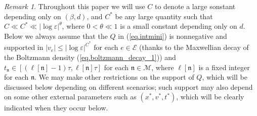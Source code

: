\documentclass[10pt, reqno]{amsart}
\newcommand{\Ec}{\mathcal E}
\renewcommand{\Mc}{\mathcal M}
\newcommand{\nf}{\mathfrak n}
\theoremstyle{definition}
\theoremstyle{remark}
\newtheorem{remark}[theorem]{Remark}
\numberwithin{equation}{section}
\begin{document}
\begin{remark}\label{rem.parameter} Throughout this paper we will use $C$ to denote a large sonstant depending only on $(\beta,d)$, and $C^*$ be any large quantity such that $C\ll C^*\ll|\log\varepsilon|^{\theta}$, where $0<\theta\ll 1$ is a small constant depending only on $d$. Below we always assume that the $Q$ in (\ref{eq.intmini}) is nonnegative and supported in $|v_e|\leq|\log\varepsilon|^{C^*}$ for each $e\in\Ec$ (thanks to the Maxwellian decay of the Boltzmann density (\ref{eq.boltzmann_decay_1})) and $t_\nf\in[(\ell[\nf]-1)\tau,\ell[\nf]\tau]$ for each $\nf\in\Mc$, where $\ell[\nf]$ is a fixed integer for each $\nf$. We may make other restrictions on the support of $Q$, which will be discussed below depending on different scenarios; such support may also depend on some other external parameters such as $(x^*,v^*,t^*)$, which will be clearly indicated when they occur below.
\end{remark}
\end{document}

